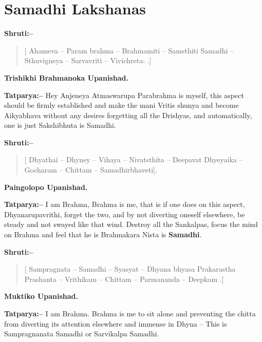 \chapter{Samadhi Lakshanas}

\textbf{Shruti:–}

\begin{verse}
[ Ahameva – Param brahma – Brahmamiti – Samsthiti  Samadhi – Sthuvigneya – Sarvavriti – Vivichreta: .]
\end{verse}

\begin{flushright}
\textbf{Trishikhi Brahmanoka Upanishad.}
\end{flushright}

\textbf{Tatparya:–} Hey Anjeneya Atmaswarupa Parabrahma is myself, this aspect should be firmly established and make the mani Vritis shunya and become Aikyabhava without any desires forgetting all the Drishyas, and automatically, one is just Sakshibhuta is Samadhi.

\textbf{Shruti:–}

\begin{verse}
[ Dhyathai – Dhyney – Vihaya – Nivatsthita – Deepavat  Dhyeyaika – Gocharam – Chittam – Samadhirbhaveti].
\end{verse}

\begin{flushright}
\textbf{Paingolopo Upanishad.}
\end{flushright}

\textbf{Tatparya:–} I am Brahma, Brahma is me, that is if one does  on this aspect, Dhyanarupavrithi, forget the two, and by not diverting oneself elsewhere, be steady and not swayed like that wind. Destroy all the Sankalpas, focus the mind on Brahma and feel that he is Brahmakara Nista is \textbf{Samadhi}.

\textbf{Shruti:–}

\begin{verse}
[ Sampragnata – Samadhi – Syasyat – Dhyana bhyasa Prakarastha Prashanta – Vrithikam – Chittam – Parmananda – Deepkam .]
\end{verse}

\begin{flushright}
\textbf{Muktiko Upanishad.}
\end{flushright}

\textbf{Tatparya:–} I am Brahma. Brahma is me to sit alone and preventing the chitta from diverting its attention elsewhere and immense in Dhyna – This is Sampragnanata Samadhi or Sarvikalpa Samadhi.

